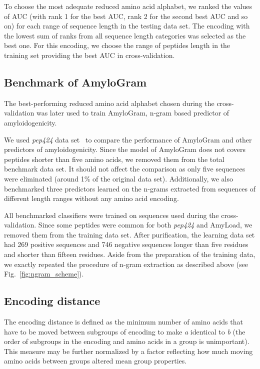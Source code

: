 \documentclass{bioinfo}
\begin{document}
\begin{methods}
  To choose the most adequate reduced amino acid alphabet, we ranked the values 
of AUC (with rank 1 for the best AUC, rank 2 for the second best AUC and so on) 
for each range of sequence length in the testing data set. The encoding with 
the lowest sum of ranks from all sequence length categories was selected as 
the best one. For this encoding, we choose the range of peptides length in the 
training set providing the best AUC in cross-validation.


\subsection{Benchmark of AmyloGram}

The best-performing reduced amino acid alphabet chosen during the 
cross-validation was later used to train AmyloGram, n-gram based predictor of 
amyloidogenicity.

  We used \textit{pep424} data set~\citep{walsh_pasta_2014} to compare the 
performance of AmyloGram and other predictors of amyloidogenicity. Since the 
model of AmyloGram does not covers peptides shorter than five amino acids, we 
removed them from the total benchmark data set. It should not affect the 
comparison as only five sequences were eliminated (around 1\% of the original 
data set). Additionally, we also benchmarked three predictors learned on the 
n-grams extracted from sequences of different length ranges without any amino 
acid encoding.

  All benchmarked classifiers were trained on sequences used during the 
cross-validation. Since some peptides were common for both \textit{pep424} and 
AmyLoad, we removed them from the training data set. After purification, the 
learning data set had 269 positive sequences and 746 negative sequences longer 
than five residues and shorter than fifteen residues. Aside from the 
preparation of the training data, we exactly repeated the procedure of n-gram 
extraction as described above (see Fig.~\ref{fig:ngram_scheme}). 

\subsection{Encoding distance}
The encoding distance is defined as the minimum number of amino acids that have to be moved between subgroups of encoding to make \textit{a} identical to \textit{b} (the order of subgroups in the encoding and amino acids in a group is unimportant). This measure may be further normalized by a factor reflecting how much moving amino acids between groups altered mean group properties. 


\end{methods}
\end{document}
